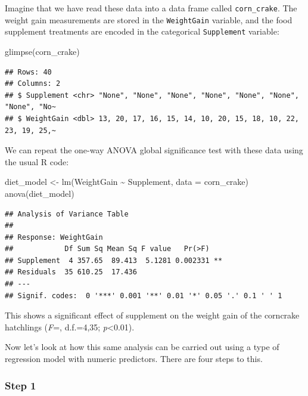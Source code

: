\documentclass[
]{book}
\newenvironment{Shaded}{\begin{snugshade}}{\end{snugshade}}
\newcommand{\AttributeTok}[1]{\textcolor[rgb]{0.77,0.63,0.00}{#1}}
\newcommand{\FunctionTok}[1]{\textcolor[rgb]{0.00,0.00,0.00}{#1}}
\newcommand{\NormalTok}[1]{#1}
\newcommand{\OtherTok}[1]{\textcolor[rgb]{0.56,0.35,0.01}{#1}}
\newcommand{\SpecialCharTok}[1]{\textcolor[rgb]{0.00,0.00,0.00}{#1}}
\begin{document}
Imagine that we have read these data into a data frame called \texttt{corn\_crake}. The weight gain measurements are stored in the \texttt{WeightGain} variable, and the food supplement treatments are encoded in the categorical \texttt{Supplement} variable:

\begin{Shaded}
\begin{Highlighting}[]
\FunctionTok{glimpse}\NormalTok{(corn\_crake)}
\end{Highlighting}
\end{Shaded}

\begin{verbatim}
## Rows: 40
## Columns: 2
## $ Supplement <chr> "None", "None", "None", "None", "None", "None", "None", "No~
## $ WeightGain <dbl> 13, 20, 17, 16, 15, 14, 10, 20, 15, 18, 10, 22, 23, 19, 25,~
\end{verbatim}

We can repeat the one-way ANOVA global significance test with these data using the usual R code:

\begin{Shaded}
\begin{Highlighting}[]
\NormalTok{diet\_model }\OtherTok{\textless{}{-}} \FunctionTok{lm}\NormalTok{(WeightGain }\SpecialCharTok{\textasciitilde{}}\NormalTok{ Supplement, }\AttributeTok{data =}\NormalTok{ corn\_crake)}
\FunctionTok{anova}\NormalTok{(diet\_model)}
\end{Highlighting}
\end{Shaded}

\begin{verbatim}
## Analysis of Variance Table
## 
## Response: WeightGain
##            Df Sum Sq Mean Sq F value   Pr(>F)   
## Supplement  4 357.65  89.413  5.1281 0.002331 **
## Residuals  35 610.25  17.436                    
## ---
## Signif. codes:  0 '***' 0.001 '**' 0.01 '*' 0.05 '.' 0.1 ' ' 1
\end{verbatim}

This shows a significant effect of supplement on the weight gain of the corncrake hatchlings (\emph{F}=, d.f.=4,35; \emph{p}\textless0.01).

Now let's look at how this same analysis can be carried out using a type of regression model with numeric predictors. There are four steps to this.

\hypertarget{step-1}{%
\subsubsection{Step 1}\label{step-1}}
\end{document}
